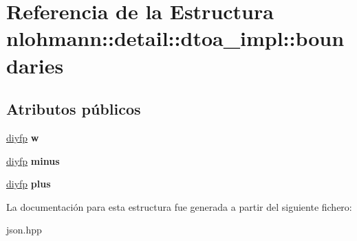 \hypertarget{structnlohmann_1_1detail_1_1dtoa__impl_1_1boundaries}{}\section{Referencia de la Estructura nlohmann\+:\+:detail\+:\+:dtoa\+\_\+impl\+:\+:boundaries}
\label{structnlohmann_1_1detail_1_1dtoa__impl_1_1boundaries}
\subsection*{Atributos públicos}
\begin{DoxyCompactItemize}
\item 
\mbox{\label{structnlohmann_1_1detail_1_1dtoa__impl_1_1boundaries_ad1668c60aeade5f2557fafed8b8aee1a}} 
\mbox{\hyperlink{structnlohmann_1_1detail_1_1dtoa__impl_1_1diyfp}{diyfp}} {\bfseries w}
\item 
\mbox{\label{structnlohmann_1_1detail_1_1dtoa__impl_1_1boundaries_aec4e5028333c01f3229062f31ce16763}} 
\mbox{\hyperlink{structnlohmann_1_1detail_1_1dtoa__impl_1_1diyfp}{diyfp}} {\bfseries minus}
\item 
\mbox{\label{structnlohmann_1_1detail_1_1dtoa__impl_1_1boundaries_a3321ae2816a6ec5250a0d8e29f798232}} 
\mbox{\hyperlink{structnlohmann_1_1detail_1_1dtoa__impl_1_1diyfp}{diyfp}} {\bfseries plus}
\end{DoxyCompactItemize}


La documentación para esta estructura fue generada a partir del siguiente fichero\+:\begin{DoxyCompactItemize}
\item 
json.\+hpp\end{DoxyCompactItemize}
